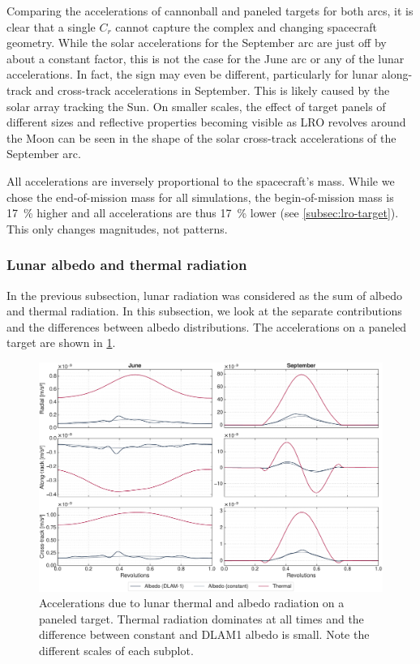 Comparing the accelerations of cannonball and paneled targets for both arcs, it is clear that a single $C_r$ cannot capture the complex and changing spacecraft geometry. While the solar accelerations for the September arc are just off by about a constant factor, this is not the case for the June arc or any of the lunar accelerations. In fact, the sign may even be different, particularly for lunar along-track and cross-track accelerations in September. This is likely caused by the solar array tracking the Sun. On smaller scales, the effect of target panels of different sizes and reflective properties becoming visible as \gls{LRO} revolves around the Moon can be seen in the shape of the solar cross-track accelerations of the September arc.

All accelerations are inversely proportional to the spacecraft's mass. While we chose the end-of-mission mass for all simulations, the begin-of-mission mass is \qty{17}{\percent} higher and all accelerations are thus \qty{17}{\percent} lower (see \cref{subsec:lro-target}). This only changes magnitudes, not patterns.





\subsubsection{Lunar albedo and thermal radiation}
In the previous subsection, lunar radiation was considered as the sum of albedo and thermal radiation. In this subsection, we look at the separate contributions and the differences between albedo distributions. The accelerations on a paneled target are shown in \cref{fig:acc-albedovsthermal}.

\begin{figure}[tb]
    \centering
    \includegraphics[width=\textwidth]{figures/plots/acc_albedovsthermal.pdf}

    \caption{Accelerations due to lunar thermal and albedo radiation on a paneled target. Thermal radiation dominates at all times and the difference between constant and \gls{DLAM1} albedo is small. Note the different scales of each subplot.}
    \label{fig:acc-albedovsthermal}
\end{figure}

